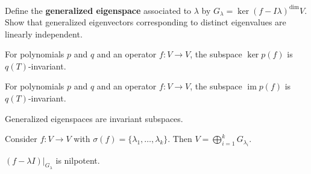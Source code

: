 \documentclass{homework}
\DeclareMathOperator{\image}{im}
\begin{document}

\vfill

\begin{problem}
  Define the \textbf{generalized eigenspace} associated to $\lambda$ by $G_\lambda = \ker (f - I\lambda)^\dim V$.  Show that generalized eigenvectors corresponding to distinct eigenvalues are linearly independent.
\end{problem}

\vfill

\begin{problem}
  For polynomials $p$ and $q$ and an operator $f : V \to V$, the subspace $\ker p(f)$ is $q(T)$-invariant.
\end{problem}

\vfill

\begin{problem}
  For polynomials $p$ and $q$ and an operator $f : V \to V$, the subspace $\image p(f)$ is $q(T)$-invariant.
\end{problem}

\vfill

\begin{problem}
  Generalized eigenspaces are invariant subspaces.
\end{problem}

\vfill

\begin{problem}
  Consider $f : V \to V$ with $\sigma(f) = \{ \lambda_1,\ldots,\lambda_k \}$.  Then $V = \bigoplus_{i=1}^k G_{\lambda_i}$.
\end{problem}

\vfill

\begin{problem}
  $(f - \lambda I) |_{G_\lambda}$ is nilpotent.
\end{problem}

\vfill
\end{document}
